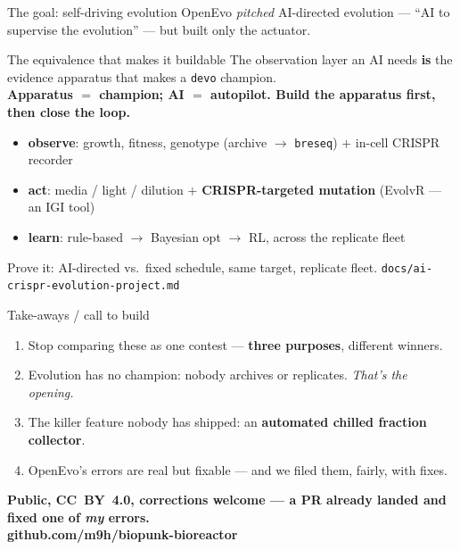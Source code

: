 \documentclass[aspectratio=169,11pt]{beamer}
\newcommand{\gd}[1]{\textcolor{good}{#1}}
\newcommand{\bd}[1]{\textcolor{bad}{#1}}
\newcommand{\ac}[1]{\textcolor{accent}{\textbf{#1}}}
\begin{document}
\begin{frame}{The goal: self-driving evolution}
  OpenEvo \emph{pitched} AI-directed evolution --- ``AI to supervise the evolution'' --- but built only the actuator.
  \begin{block}{The equivalence that makes it buildable}
  The observation layer an AI needs \ac{is} the evidence apparatus that makes a \texttt{devo} champion. \\
  \textbf{Apparatus $=$ champion; AI $=$ autopilot. Build the apparatus first, then close the loop.}
  \end{block}
  \begin{itemize}\small
    \item \textbf{observe}: growth, fitness, genotype (archive $\to$ \texttt{breseq}) $+$ in-cell CRISPR recorder
    \item \textbf{act}: media / light / dilution $+$ \ac{CRISPR-targeted mutation} (EvolvR --- an IGI tool)
    \item \textbf{learn}: rule-based $\to$ Bayesian opt $\to$ RL, across the replicate fleet
  \end{itemize}
  \begin{center}\small Prove it: AI-directed vs.\ fixed schedule, same target, replicate fleet. \quad\texttt{docs/ai-crispr-evolution-project.md}\end{center}
\end{frame}

\begin{frame}{Take-aways / call to build}
  \begin{enumerate}
    \item Stop comparing these as one contest --- \ac{three purposes}, different winners.
    \item Evolution has \bd{no champion}: nobody archives or replicates. \emph{That's the opening.}
    \item The killer feature nobody has shipped: an \ac{automated chilled fraction collector}.
    \item OpenEvo's errors are real but \gd{fixable} --- and we filed them, fairly, with fixes.
  \end{enumerate}
  \vspace{0.8em}
  \begin{center}
  \textbf{Public, CC~BY~4.0, corrections welcome --- a PR already landed and fixed one of \emph{my} errors.}\\[0.4em]
  \ac{github.com/m9h/biopunk-bioreactor}
  \end{center}
\end{frame}
\end{document}
